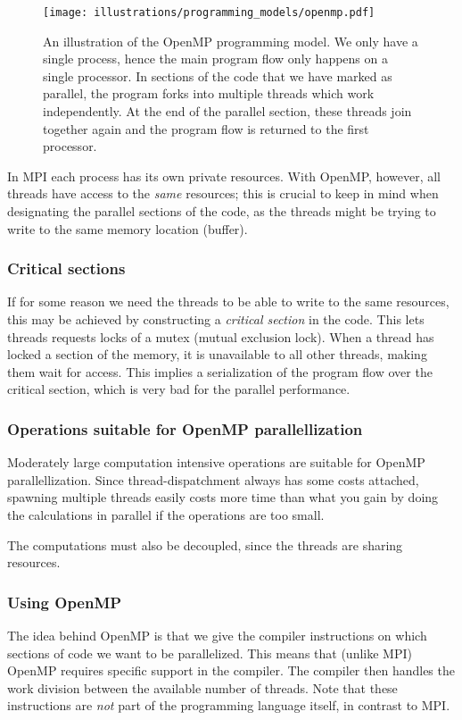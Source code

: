 \begin{figure}[htbp]
  \centering
  \texttt{[image: illustrations/programming\_models/openmp.pdf]}
  \caption{An illustration of the OpenMP programming model. We only have a single process, hence the main program flow only happens on a single processor. In sections of the code that we have marked as parallel, the program forks into multiple threads which work independently. At the end of the parallel section, these threads join together again and the program flow is returned to the first processor.}
  \label{fig:openmp}
\end{figure}

In MPI each process has its own private resources. With OpenMP, however, all threads have access to the \emph{same} resources; this is crucial to keep in mind when designating the parallel sections of the code, as the threads might be trying to write to the same memory location (buffer).

\subsubsection{Critical sections} %
\label{ssub:critical_sections}
If for some reason we need the threads to be able to write to the same resources, this may be achieved by constructing a \emph{critical section} in the code. This lets threads requests locks of a mutex (mutual exclusion lock). When a thread has locked a section of the memory, it is unavailable to all other threads, making them wait for access. This implies a serialization of the program flow over the critical section, which is very bad for the parallel performance.

\subsubsection{Operations suitable for OpenMP parallellization} %
\label{ssub:operations_suitable_for_openmp_parallellization}
Moderately large computation intensive operations are suitable for OpenMP parallellization. Since thread-dispatchment always has some costs attached, spawning multiple threads easily costs more time than what you gain by doing the calculations in parallel if the operations are too small.

The computations must also be decoupled, since the threads are sharing resources.

\subsubsection{Using OpenMP} %
\label{ssub:using_openmp}
The idea behind OpenMP is that we give the compiler instructions on which sections of code we want to be parallelized. This means that (unlike MPI) OpenMP requires specific support in the compiler. The compiler then handles the work division between the available number of threads. Note that these instructions are \emph{not} part of the programming language itself, in contrast to MPI.

